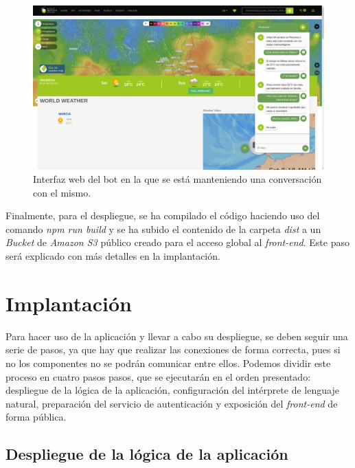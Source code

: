 \documentclass[11pt,spanish,listoffigures]{tfgetsinf}
\begin{document}
\begin{figure}[h!]
    \centering
    \includegraphics[width=1\textwidth]{images/img19.png}
    \caption{Interfaz web del bot en la que se está manteniendo una conversación con el mismo.}
    \label{fig:panel-conversation}
\end{figure}

Finalmente, para el despliegue, se ha compilado el código haciendo uso del comando \textit{npm run build} y se ha subido el contenido de la carpeta \textit{dist} a un \textit{Bucket} de \textit{Amazon S3} público creado para el acceso global al \textit{front-end}. Este paso será explicado con más detalles en la implantación.




\chapter{Implantación}
\label{ch:implantacion}

Para hacer uso de la aplicación y llevar a cabo su despliegue, se deben seguir una serie de pasos, ya que hay que realizar las conexiones de forma correcta, pues si no los componentes no se podrán comunicar entre ellos. Podemos dividir este proceso en cuatro pasos pasos, que se ejecutarán en el orden presentado: despliegue de la lógica de la aplicación, configuración del intérprete de lenguaje natural, preparación del servicio de autenticación y exposición del \textit{front-end} de forma pública.

\section{Despliegue de la lógica de la aplicación}
\label{sec:implantacion-backend}
\end{document}
